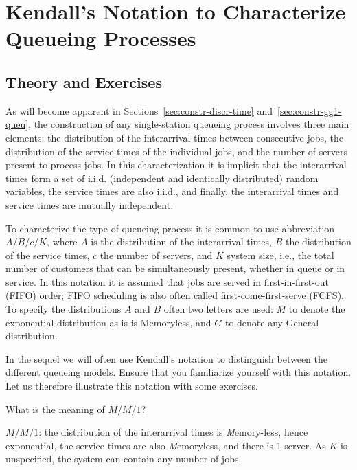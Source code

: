 
\section{Kendall's Notation to Characterize Queueing Processes}
\label{sec:kendalls-notation}




\subsection*{Theory and Exercises}

As will become apparent in Sections~\ref{sec:constr-discr-time}
and~\ref{sec:constr-gg1-queu}, the construction of any single-station queueing
process involves three main elements: 
the distribution of the
interarrival times between consecutive jobs, the distribution of the
service times of the individual jobs, and the number of servers
present to process jobs. In this characterization it is implicit that
the interarrival times form a set of i.i.d. (independent and
identically distributed) random variables, the service times are also
i.i.d., and finally, the interarrival times and service times are
mutually independent.

To characterize the type of queueing process it is common to use 
 abbreviation $A/B/c/K$, where $A$ is the distribution of the
interarrival times, $B$ the distribution of the service times, $c$ the
number of servers, and $K$ system size, i.e., the total number of customers that can be simultaneously present, whether in queue or in service. In this notation it
is assumed that jobs are served in first-in-first-out (FIFO) order;
FIFO scheduling is also often called first-come-first-serve (FCFS). To specify the distributions $A$ and $B$ often two letters are used: $M$ to denote the exponential distribution as is is Memoryless, and $G$ to denote any General distribution. 

In the sequel we will often use Kendall's notation  to distinguish between the different queueing models. Ensure that you familiarize yourself with this notation. Let us therefore illustrate this notation with some exercises. 

\begin{exercise}
  What is the meaning of $M/M/1$?
  \begin{solution}
$M/M/1$: the distribution of the interarrival times is
  \emph{M}emory-less, hence exponential, the service times are also
  \emph{M}emoryless, and there is 1 server. As $K$ is unspecified, the system can contain any number of jobs.
  \end{solution}
\end{exercise}

